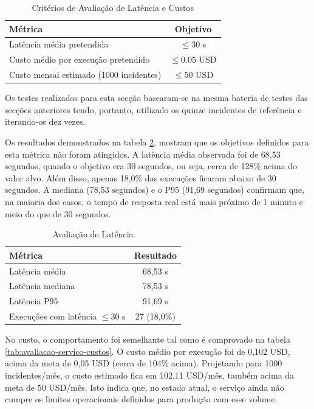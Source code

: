 		\begin{table}[H]
			\centering
			\small
			\begin{tabular}{lc}
				\hline
				\textbf{Métrica} & \textbf{Objetivo} \\
				\hline
				Latência média pretendida & $\leq30$ s \\
				\hline
				Custo médio por execução pretendido & $\leq0.05$ USD \\
				\hline
				Custo mensal estimado (1000 incidentes) & $\leq50$ USD \\
				\hline
			\end{tabular}
			\caption[Critérios de Avaliação de Latência e Custos]{Critérios de Avaliação de Latência e Custos}
			\label{tab:classificacao-servico}
		\end{table}
		
		Os testes realizados para esta secção basearam-se na mesma bateria de testes das secções anteriores tendo, portanto, utilizado os quinze incidentes de referência e iterando-os dez vezes.
		
		Os resultados demonstrados na tabela \ref{tab:avaliacao-servico-latencia}, mostram que os objetivos definidos para esta métrica não foram atingidos. A latência média observada foi de 68,53 segundos, quando o objetivo era 30 segundos, ou seja, cerca de 128\% acima do valor alvo. Além disso, apenas 18,0\% das execuções ficaram abaixo de 30 segundos. A mediana (78,53 segundos) e o P95 (91,69 segundos) confirmam que, na maioria dos casos, o tempo de resposta real está mais próximo de 1 minuto e meio do que de 30 segundos.
		
		\begin{table}[H]
			\centering
			\small
			\begin{tabular}{lc}
				\hline
				\textbf{Métrica} & \textbf{Resultado} \\
				\hline
				Latência média & 68,53 s \\
				\hline
				Latência mediana & 78,53 s \\
				\hline
				Latência P95 & 91,69 s \\
				\hline
				Execuções com latência $\leq30$ s & 27 (18,0\%) \\
				\hline
			\end{tabular}
			\caption[Avaliação de Latência]{Avaliação de Latência}
			\label{tab:avaliacao-servico-latencia}
		\end{table}
		
		No custo, o comportamento foi semelhante tal como é comprovado na tabela \ref{tab:avaliacao-servico-custos}. O custo médio por execução foi de 0,102 USD, acima da meta de 0,05 USD (cerca de 104\% acima). Projetando para 1000 incidentes/mês, o custo estimado fica em 102,11 USD/mês, também acima da meta de 50 USD/mês. Isto indica que, no estado atual, o serviço ainda não cumpre os limites operacionais definidos para produção com esse volume.
		
